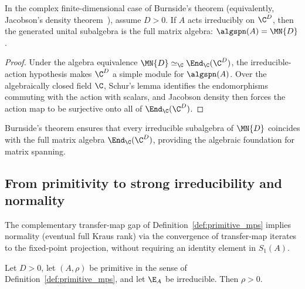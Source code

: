 \begin{lemma}\label{thm:burnside_matrix}
    \leanok
    In the complex finite-dimensional case of Burnside's theorem (equivalently,
    Jacobson's density theorem~\cite{Jacobson2009BasicAlgebraII}), assume
    $D>0$. If $A$ acts irreducibly on $\C^D$, then the generated unital
    subalgebra is the full matrix algebra: $\algspn(A)=\MN{D}$.
\end{lemma}

\begin{proof}\leanok
    Under the algebra equivalence $\MN{D}\simeq_{\C}\End_{\C}(\C^D)$, the
    irreducible-action hypothesis makes $\C^D$ a simple module for
    $\algspn(A)$.
    Over the algebraically closed field $\C$, Schur's lemma identifies the
    endomorphisms commuting with the action with scalars, and Jacobson density
    then forces the action map to be surjective onto all of
    $\End_{\C}(\C^D)$.
\end{proof}

\begin{remark}\leanok
    Burnside's theorem ensures that every irreducible subalgebra of $\MN{D}$
    coincides with the full matrix algebra $\End_{\C}(\C^D)$, providing the
    algebraic foundation for matrix spanning.
\end{remark}

\subsection{From primitivity to strong irreducibility and normality}%
\label{subsec:prim_normality_connection}

The complementary transfer-map gap of Definition~\ref{def:primitive_mps} implies
normality (eventual full Kraus rank) via the convergence of transfer-map iterates
to the fixed-point projection, without requiring an identity element in $S_1(A)$.

\begin{lemma}%
    \label{thm:primitive_fixed_point_posdef_of_irreducible_map}
    \leanok
    Let $D>0$, let $(A,\rho)$ be primitive in the sense of
    Definition~\ref{def:primitive_mps}, and let $\E_A$ be irreducible.  Then
    $\rho>0$.
\end{lemma}


